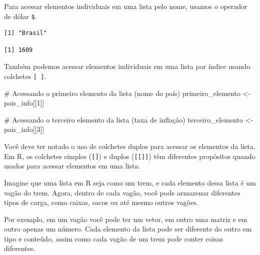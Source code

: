 \documentclass[
  portuguese,
  letterpaper,
  DIV=11,
  numbers=noendperiod]{scrreprt}
\newenvironment{Shaded}{\begin{snugshade}}{\end{snugshade}}
\newcommand{\CommentTok}[1]{\textcolor[rgb]{0.37,0.37,0.37}{#1}}
\newcommand{\DecValTok}[1]{\textcolor[rgb]{0.68,0.00,0.00}{#1}}
\newcommand{\NormalTok}[1]{\textcolor[rgb]{0.00,0.23,0.31}{#1}}
\newcommand{\OtherTok}[1]{\textcolor[rgb]{0.00,0.23,0.31}{#1}}
\newcommand{\SpecialCharTok}[1]{\textcolor[rgb]{0.37,0.37,0.37}{#1}}
\theoremstyle{definition}
\theoremstyle{remark}
\begin{document}
Para acessar elementos individuais em uma lista pelo nome, usamos o
operador de dólar \texttt{\$}.

\begin{Shaded}
\end{Shaded}

\begin{verbatim}
[1] "Brasil"
\end{verbatim}

\begin{Shaded}
\end{Shaded}

\begin{verbatim}
[1] 1609
\end{verbatim}

Também podemos acessar elementos individuais em uma lista por índice
usando colchetes \texttt{{[}\ {]}}.

\begin{Shaded}
\begin{Highlighting}[]
\CommentTok{\# Acessando o primeiro elemento da lista (nome do país)}
\NormalTok{primeiro\_elemento }\OtherTok{\textless{}{-}}\NormalTok{ pais\_info[[}\DecValTok{1}\NormalTok{]]}

\CommentTok{\# Acessando o terceiro elemento da lista (taxa de inflação)}
\NormalTok{terceiro\_elemento }\OtherTok{\textless{}{-}}\NormalTok{ pais\_info[[}\DecValTok{3}\NormalTok{]]}
\end{Highlighting}
\end{Shaded}

Você deve ter notado o uso de colchetes duplos para acessar os elementos
da lista. Em R, os colchetes simples (\texttt{{[}{]}}) e duplos
(\texttt{{[}{[}{]}{]}}) têm diferentes propósitos quando usados para
acessar elementos em uma lista.

Imagine que uma lista em R seja como um trem, e cada elemento dessa
lista é um vagão do trem. Agora, dentro de cada vagão, você pode
armazenar diferentes tipos de carga, como caixas, sacos ou até mesmo
outros vagões.

Por exemplo, em um vagão você pode ter um vetor, em outro uma matriz e
em outro apenas um número. Cada elemento da lista pode ser diferente do
outro em tipo e conteúdo, assim como cada vagão de um trem pode conter
coisas diferentes.
\end{document}
